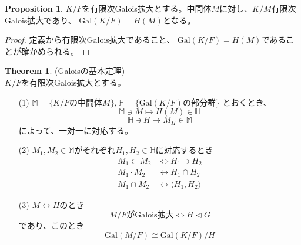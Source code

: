 \documentclass{ltjsarticle}
\theoremstyle{definition}
\newtheorem{prop}[definition]{Proposition}
\newtheorem{theorem}[definition]{Theorem}
\begin{document}
\begin{prop}\label{tyuukanngal}
  $K/F$を有限次Galois拡大とする。中間体$M$に対し、$K/M$有限次Galois拡大であり、
  $\mathrm{Gal}(K/F)=H(M)$となる。
\end{prop}
\begin{proof}
  定義から有限次Galois拡大であること、
  $\mathrm{Gal}(K/F)=H(M)$であることが確かめられる。
\end{proof}
\begin{theorem}\label{gal} (Galoisの基本定理)\\
  $K/F$を有限次Galois拡大とする。
  \begin{enumerate}
    \item [(1)]
          $\mathbb{M}=\{K/F\mathrm{の中間体}M\},\mathbb{H}=\{\mathrm{Gal}(K/F)\mathrm{の部分群}\}$
          とおくとき、
          \[\mathbb{M}\ni M\longmapsto H(M)\in\mathbb{H}\]
          \[\mathbb{H}\ni H\longmapsto M_H\in\mathbb{M}\]
           によって、一対一に対応する。
    \item [(2)]
          $M_1,M_2\in\mathbb{M}$がそれぞれ$H_1,H_2\in\mathbb{H}$に対応するとき
          \begin{align*}
            M_1\subset M_2&\Longleftrightarrow H_1\supset H_2\\
            M_1\cdot M_2&\longleftrightarrow H_1\cap H_2\\
            M_1\cap M_2&\longleftrightarrow \langle H_1,H_2\rangle
          \end{align*}
    \item[(3)]
         $M\longleftrightarrow H$のとき
         \[M/F\mathrm{がGalois拡大}\Longleftrightarrow H\vartriangleleft G\]
         であり、このとき
         \[\mathrm{Gal}(M/F)\cong \mathrm{Gal}(K/F)/H\]
  \end{enumerate}
\end{theorem}
\end{document}
